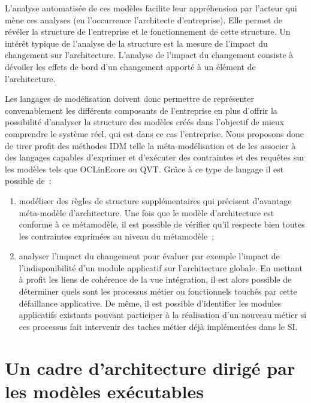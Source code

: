 L'analyse automatisée de ces modèles facilite leur appréhension par l'acteur qui
mène ces analyses (en l'occurrence l'architecte d'entreprise). Elle permet de
révéler la structure de l'entreprise et le fonctionnement de cette structure. Un
intérêt typique de l'analyse de la structure est la mesure de l'impact du
changement \cite{de2005change} sur l'architecture. L'analyse de l'impact du
changement consiste à dévoiler les effets de bord d'un changement apporté à un
élément de l'architecture.

Les langages de modélisation doivent donc permettre de représenter
convenablement les différents composants de l'entreprise en plus d'offrir la
possibilité d'analyser la structure des modèles créés dans l'objectif de mieux
comprendre le système réel, qui est dans ce cas l'entreprise. Nous proposons
donc de tirer profit des méthodes IDM telle la méta-modélisation et de les
associer à des langages capables d'exprimer et d'exécuter des contraintes et des
requêtes sur les modèles tels que OCLinEcore ou QVT. Grâce à ce type de langage
il est possible de~:

\begin{enumerate}
    \item modéliser des règles de structure supplémentaires qui précisent d'avantage méta-modèle d'architecture. Une fois
que le modèle d'architecture est conforme à ce métamodèle, il est possible de
vérifier qu'il respecte bien toutes les contraintes exprimées au niveau du
métamodèle~;
    \item analyser l'impact du changement pour évaluer par exemple
l'impact de l'indisponibilité d'un module applicatif sur l'architecture
globale. En mettant à profit les liens de cohérence de la vue intégration, il
est alors possible de déterminer quels sont les processus métier ou
fonctionnels touchés par cette défaillance applicative. De même, il est
possible d'identifier les modules applicatifs existants pouvant participer à la
réalisation d'un nouveau métier si ces processus fait intervenir des taches
métier déjà implémentées dans le SI.
    \end{enumerate}

















\section{Un cadre d'architecture dirigé par les modèles exécutables}



